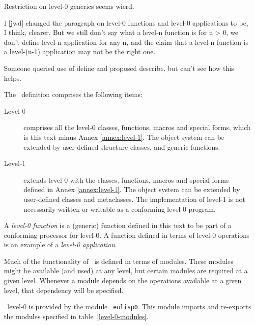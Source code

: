 \label{subsec:lang-struct}
%
\begin{optPrivate}
    Restriction on level-0 generics seems wierd.

    I [jwd] changed the paragraph on level-0 functions and level-0 applications
    to be, I think, clearer.  But we still don't say what a level-n function is
    for n > 0, we don't define level-n application for any n, and the claim that
    a level-n function is a level-(n-1) application may not be the right one.

    Someone queried use of define and proposed describe, but can't see how this
    helps.
\end{optPrivate}
%
\begin{optDefinition}
The \eulisp\ definition comprises the following items:
\begin{description}
    \item[Level-0] comprises all the
    level-0 classes, functions, macros and special forms, which is this text minus Annex \ref{annex:level-1}.  The object
    system can be extended by user-defined structure classes, and generic
    functions.

    \item[Level-1] extends level-0 with
    the classes, functions, macros and special forms defined in Annex
    \ref{annex:level-1}.  The object system can be extended by user-defined
    classes and metaclasses.  The implementation of level-1 is not
    necessarily written or writable as a conforming level-0 program.
\end{description}
%
A {\em level-0 function\/} is a (generic) function defined in this text to be
part of a conforming processor for level-0.  A function defined in terms of
level-0 operations is an example of a {\em level-0 application}.

Much of the functionality of \eulisp\ is defined in terms of
modules.  These modules might be
available (and used) at any level, but certain modules are required at a given
level.  Whenever a module depends on the operations available at a given level,
that dependency will be specified.

\eulisp\ level-0 is provided by the module {\tt
    eulisp0}.  This module imports and
re-exports the modules specified in table~\ref{level-0-modules}.


\end{optDefinition}
